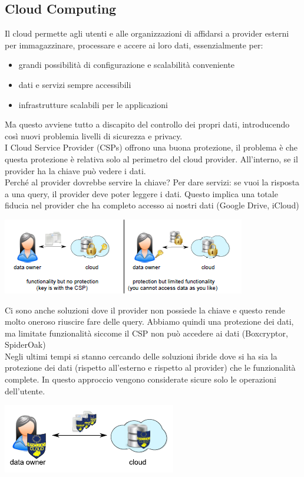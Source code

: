 \subsection{Cloud Computing}
Il cloud permette agli utenti e alle organizzazioni di affidarsi a provider esterni per immagazzinare, processare e accere ai loro dati, essenzialmente per: 
\begin{itemize}
    \item grandi possibilità di configurazione e scalabilità conveniente
    \item dati e servizi sempre accessibili
    \item infrastrutture scalabili per le applicazioni
\end{itemize}
Ma questo avviene tutto a discapito del controllo dei propri dati, introducendo così nuovi problemia livelli di sicurezza e privacy.\\
I Cloud Service Provider (CSPs) offrono una buona protezione, il problema è che questa protezione è relativa solo al perimetro del cloud provider. All’interno, se il provider ha la chiave può vedere i dati. \\
Perché al provider dovrebbe servire la chiave? Per dare servizi: se vuoi la risposta a una query, il provider deve poter leggere i dati. Questo implica una totale fiducia nel provider che ha completo accesso ai nostri dati (Google Drive, iCloud) \\
\begin{center}
    \includegraphics[scale=0.7]{img/csp.png}
\end{center}
Ci sono anche soluzioni dove il provider non possiede la chiave e questo rende molto oneroso riuscire fare delle query. Abbiamo quindi una protezione dei dati, ma limitate funzionalità siccome il CSP non può accedere ai dati (Boxcryptor, SpiderOak)\\
Negli ultimi tempi si stanno cercando delle soluzioni ibride dove si ha sia la protezione dei dati (rispetto all'esterno e rispetto al provider) che le funzionalità complete. In questo approccio vengono considerate sicure solo le operazioni dell'utente. 
\begin{center}
    \includegraphics[scale=0.7]{img/escudo.png}
\end{center}
